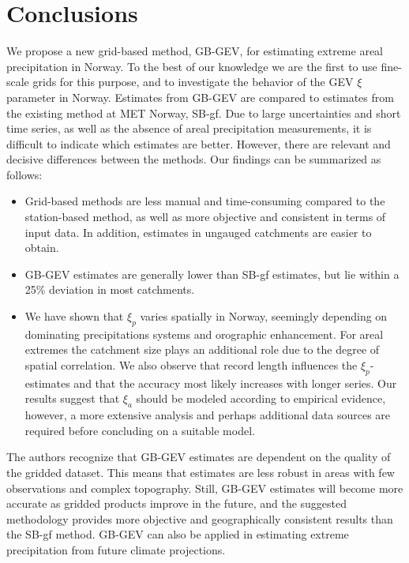 \documentclass[12pt,a4paper,english]{article}
\begin{document}
\clearpage


\section{Conclusions}

We propose a new grid-based method, GB-GEV, for estimating extreme areal precipitation in Norway. To the best of our knowledge we are the first to use fine-scale grids for this purpose, and to investigate the behavior of the GEV $\xi$ parameter in Norway. Estimates from GB-GEV are compared to estimates from the existing method at MET Norway, SB-gf. Due to large uncertainties and short time series, as well as the absence of areal precipitation measurements, it is difficult to indicate which estimates are better. However, there are relevant and decisive differences between the methods. Our findings can be summarized as follows:

\begin{itemize}
\item Grid-based methods are less manual and time-consuming compared to the station-based method, as well as more objective and consistent in terms of input data. In addition, estimates in ungauged catchments are easier to obtain. %

\item GB-GEV estimates are generally lower than SB-gf estimates, but lie within a 25\% deviation in most catchments.  

\item We have shown that $\xi_{p}$ varies spatially in Norway, seemingly depending on dominating precipitations systems and orographic enhancement. For areal extremes the catchment size plays an additional role due to the degree of spatial correlation. We also observe that record length influences the $\xi_{p}$-estimates and that the accuracy most likely increases with longer series. Our results suggest that $\xi_{a}$ should be modeled according to empirical evidence, however, a more extensive analysis and perhaps additional data sources are required before concluding on a suitable model.
\end{itemize}
 
\noindent The authors recognize that GB-GEV estimates are dependent on the quality of the gridded dataset. This means that estimates are less robust in areas with few observations and complex topography. Still, GB-GEV estimates will become more accurate as gridded products  improve in the future, and the suggested methodology provides more objective and geographically consistent results than the SB-gf method. GB-GEV can also be applied in estimating extreme precipitation from future climate projections. 
\end{document}
